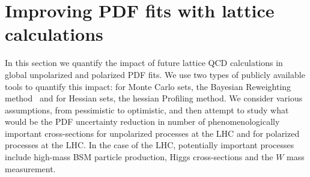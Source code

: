 \section{Improving PDF fits with lattice calculations}
\label{sec:projections}

In this section we quantify the impact of future lattice QCD calculations
in global unpolarized and polarized PDF fits.
%
We use two types of publicly available tools to quantify this
impact: for Monte Carlo sets, the Bayesian Reweighting
method~\cite{Ball:2011gg,Ball:2010gb} and for Hessian sets,
the hessian Profiling method.
%
We consider various assumptions, from pessimistic to optimistic,
and then attempt to study what would be the PDF uncertainty
reduction in number of phenomenologically
important cross-sections for unpolarized processes at the
LHC and for polarized processes at the LHC.
%
In the case of the LHC, potentially important processes include
high-mass BSM particle production, Higgs cross-sections and
the $W$ mass measurement.

